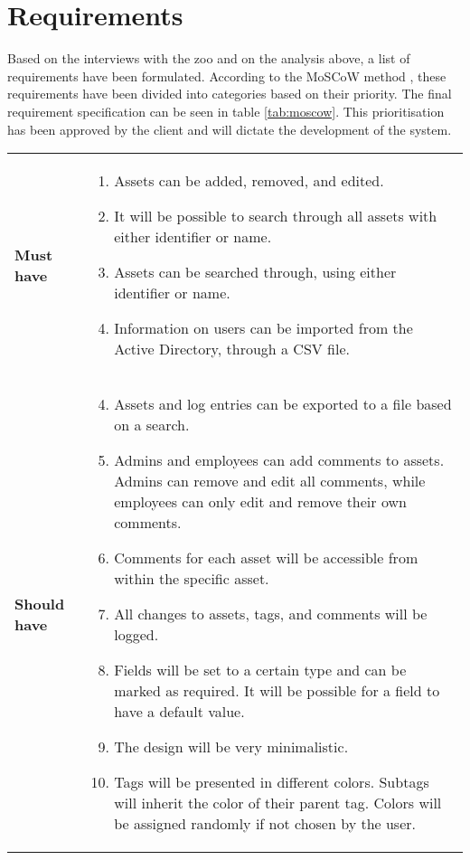 \section{Requirements}\label{sc:requirements}
Based on the interviews with the zoo and on the analysis above, a list of requirements have been formulated. According to the MoSCoW method \cite[chap 7.1]{DEB}, these requirements have been divided into categories based on their priority. The final requirement specification can be seen in table \ref{tab:moscow}. This prioritisation has been approved by the client and will dictate the development of the system. 

\begin{longtable}{p{3.2cm} p{10cm}}
    \renewcommand{\arraystretch}{2.0}
        \\
        \hline
        \textbf{Must have} & 
        \vspace*{-7mm}
        \begin{enumerate} \itemsep0em 
            \item Assets can be added, removed, and edited.
            \item It will be possible to search through all assets with either identifier or name.
            \item Assets can be searched through, using either identifier or name.
            \item Information on users can be imported from the Active Directory, through a CSV file.
        \end{enumerate}
        \\
        \hline
        
        \textbf{Should have} & 
        \vspace*{-7mm}
        \begin{enumerate} \setcounter{enumi}{3} \itemsep0em 
            \item Assets and log entries can be exported to a file based on a search.
            \item Admins and employees can add comments to assets. Admins can remove and edit all comments, while employees can only edit and remove their own comments.
            \item Comments for each asset will be accessible from within the specific asset.
            \item All changes to assets, tags, and comments will be logged.
            \item Fields will be set to a certain type and can be marked as required. It will be possible for a field to have a default value.
            \item The design will be very minimalistic.
            \item Tags will be presented in different colors. Subtags will inherit the color of their parent tag. Colors will be assigned randomly if not chosen by the user.
        \end{enumerate}
        \\
        \hline
        

\end{longtable}
